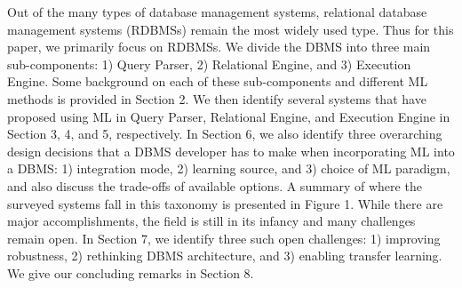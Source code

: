 Out of the many types of database management systems, relational database management systems (RDBMSs) remain the most widely used type.
Thus for this paper, we primarily focus on RDBMSs.
We divide the DBMS into three main sub-components: 1) Query Parser, 2) Relational Engine, and 3) Execution Engine. Some background on each of these sub-components and different ML methods is provided in Section 2.
We then identify several systems that have proposed using ML in Query Parser, Relational Engine, and Execution Engine in Section 3, 4, and 5, respectively.
In Section 6, we also identify three overarching design decisions that a DBMS developer has to make when incorporating ML into a DBMS: 1) integration mode, 2) learning source, and 3) choice of ML paradigm, and also discuss the trade-offs of available options.
A summary of where the surveyed systems fall in this taxonomy is presented in Figure 1.
While there are major accomplishments, the field is still in its infancy and many challenges remain open.
In Section 7, we identify three such open challenges: 1) improving robustness, 2) rethinking DBMS architecture, and 3) enabling transfer learning.
We give our concluding remarks in Section 8.